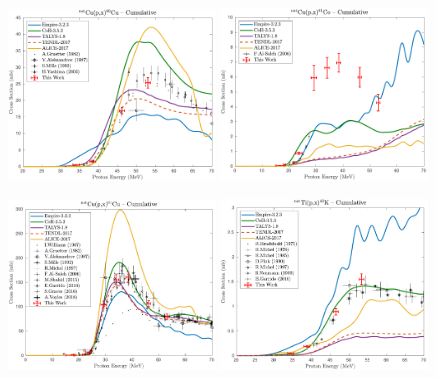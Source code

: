 \begin{figure}
 \centering
 
 \includegraphics[width=0.49\textwidth]{./figures/60Cu.pdf}
 \includegraphics[width=0.49\textwidth]{./figures/61Co.pdf}
 
 \includegraphics[width=0.49\textwidth]{./figures/61Cu.pdf}
 \includegraphics[width=0.49\textwidth]{./figures/43K.pdf}
 

\end{figure}
